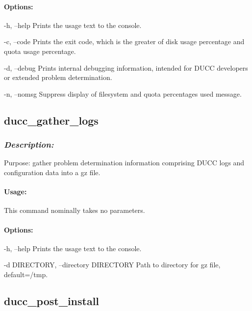     \paragraph{Options:}
    \begin{description}
      	\item -h, --help      Prints the usage text to the console. 
      	\item -c, --code      Prints the exit code, which is the greater of disk usage percentage and quota usage percentage. 
      	\item -d, --debug     Prints internal debugging information, intended for DUCC developers or extended problem determination.
      	\item -n, --nomsg     Suppress display of filesystem and quota percentages used message. 
    \end{description}       


\subsection{ducc\_gather\_logs}
\label{subsec:admin.ducc-gather-logs}
    \subsubsection{{\em Description:}}

    Purpose: gather problem determination information comprising DUCC logs and configuration data into a gz file.
    
    \paragraph{Usage:}
        This command nominally takes no parameters.
        
    \paragraph{Options:}
    \begin{description}
      	\item -h, --help      Prints the usage text to the console. 
      	\item -d DIRECTORY, --directory DIRECTORY     Path to directory for gz file, default=/tmp.
    \end{description}       
    

\subsection{ducc\_post\_install}
\label{subsec:admin.ducc-post-install}

